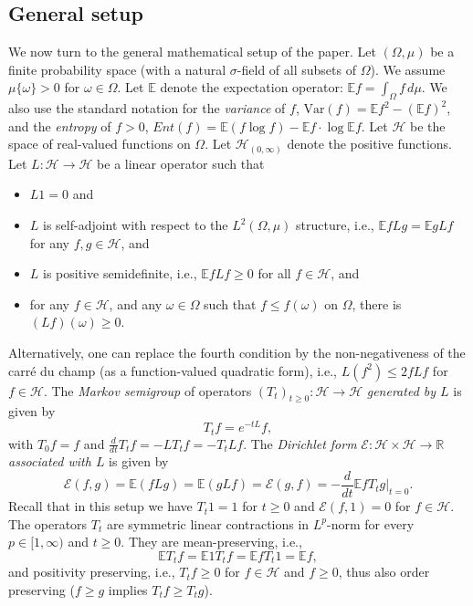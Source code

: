 \documentclass[11pt]{amsart}
\newcommand{\R}{\mathbb{R}}
\newcommand{\E}{\mathbb{E}}
\newcommand{\Var}{\mathrm{Var}}
\newcommand{\1}{\mathbf{1}}
\def\R{{\mathbb R}}
\def\e{{\mathcal{E}}}
\def\E{{\mathbb E}}
\def\H{{\mathcal{H}}}
\theoremstyle{definition}
\newtheorem{definition}[example]{Definition}
\theoremstyle{plain}
\theoremstyle{remark}
\numberwithin{equation}{section}
\begin{document}
\subsection{General setup} \label{setup}
We now turn to the general mathematical setup of the paper.
Let $(\Omega, \mu)$ be a finite probability space (with a natural $\sigma$-field of all subsets of $\Omega$).
We assume $\mu\{\omega\}>0$ for $\omega \in \Omega$.
Let $\E$ denote the expectation operator:
$\E f=\int_{\Omega} f\,d\mu$. We also use the standard notation for the {\em variance} of $f$, $\Var(f)=\E f^{2}-(\E f)^{2}$, and the {\em entropy} of $f>0$, $Ent(f)=\E(f \log f)-\E f \cdot \log \E f$.
Let $\H$ be the space of real-valued functions on $\Omega$. 
Let $\H_{(0,\infty)}$ denote the positive functions.
Let $L:\H \rightarrow \H$ be a linear operator such that
\begin{itemize}
\item $L1=0$ and
\item $L$ is self-adjoint with respect to the $L^{2}(\Omega, \mu)$ structure,
i.e., $\E fLg=\E gLf$ for any $f,g \in \H$, and
\item
$L$ is positive semidefinite, i.e., $\E fLf \geq 0$ for all $f \in \H$, and
\item for any $f \in \H$, and any $\omega \in \Omega$ such that $f \leq f(\omega)$ on $\Omega$, there is $(Lf)(\omega) \geq 0$. 
\end{itemize}
Alternatively, one can replace the fourth condition by the non-negativeness of the carr\'e du champ
(as a function-valued quadratic form), i.e., $L(f^{2}) \leq 2fLf$ for $f \in \H$.
The {\em Markov semigroup} of operators $(T_{t})_{t \geq 0}: \H \rightarrow \H$ {\em generated by $L$} is given by
\[
T_{t}f=e^{-tL}f,
\]
with $T_{0}f=f$ and $\frac{d}{dt}T_{t}f=-LT_{t}f=-T_{t}Lf$. The {\em Dirichlet form} $\e: \H \times \H \rightarrow \R$ {\em associated with $L$}
is given by
\[
\e(f,g)=\E(fLg)=\E(gLf)=\e(g,f)=
-\frac{d}{dt} \E fT_{t}g\Big|_{t=0}.
\]
Recall that in this setup we have
$T_{t}1=1$ for $t \geq 0$ and $\e(f,1)=0$ for $f \in \H$.
The operators $T_{t}$ are symmetric linear contractions in $L^{p}$-norm for every $p \in [1,\infty)$ and $t \geq 0$. They are mean-preserving, i.e.,
\[
\E T_{t}f=\E 1T_{t}f=\E fT_{t}1=\E f,
\]
and positivity preserving, i.e., $T_{t}f \geq 0$ for
$f \in \H$ and $f\ge 0$, thus also order preserving ($f \geq g$ implies $T_{t}f \geq T_{t}g$).
\end{document}

